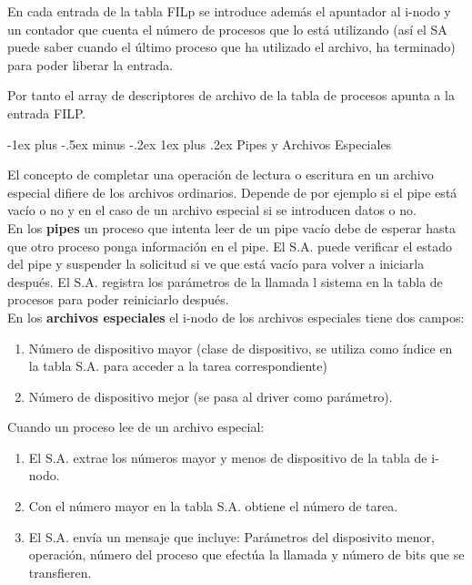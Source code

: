 \documentclass[10pt,portrait, twocolumn]{article}
\makeatletter
\renewcommand{\subsubsection}{\@startsection{subsubsection}{3}{0mm}%
                                {-1ex plus -.5ex minus -.2ex}%
                                {1ex plus .2ex}%
                                {\normalfont\small\bfseries}}
\makeatother
\begin{document}
En cada entrada de la tabla FILp se introduce además el apuntador al i-nodo y un contador que cuenta el número de procesos que lo está utilizando (así el SA puede saber cuando el último proceso que ha utilizado el archivo, ha terminado) para poder liberar la entrada.
	
	\quad Por tanto el array de descriptores de archivo de la tabla de procesos apunta a la entrada FILP.
	
\subsubsection{Pipes y Archivos Especiales}
	
El concepto de completar una operación de lectura o escritura en un archivo especial difiere de los archivos ordinarios. Depende de por ejemplo si el pipe está vacío o no y en el caso de un archivo especial si se introducen datos o no.\\

En los \textbf{pipes} un proceso que intenta leer de un pipe vacío debe de esperar hasta que otro proceso ponga información en el pipe. El S.A. puede verificar el estado del pipe y suspender la solicitud si ve que está vacío para volver a iniciarla después. El S.A. registra los parámetros de la llamada l sistema en la tabla de procesos para poder reiniciarlo después.\\

En los \textbf{archivos especiales} el i-nodo de los archivos especiales tiene dos campos:

\begin{enumerate}
	\item Número de dispositivo mayor (clase de dispositivo, se utiliza como índice en la tabla S.A. para acceder a la tarea correspondiente)
	\item Número de dispositivo mejor (se pasa al driver como parámetro).
\end{enumerate}
	
Cuando un proceso lee de un archivo especial:

	\begin{enumerate}
		\item El S.A. extrae los números mayor y menos de dispositivo de la tabla de i-nodo.
		\item Con el número mayor en la tabla S.A. obtiene el número de tarea.
		\item El S.A. envía un mensaje que incluye: Parámetros del disposivito menor, operación, número del proceso que efectúa la llamada y número de bits que se transfieren.
	\end{enumerate}
	
\end{document}
